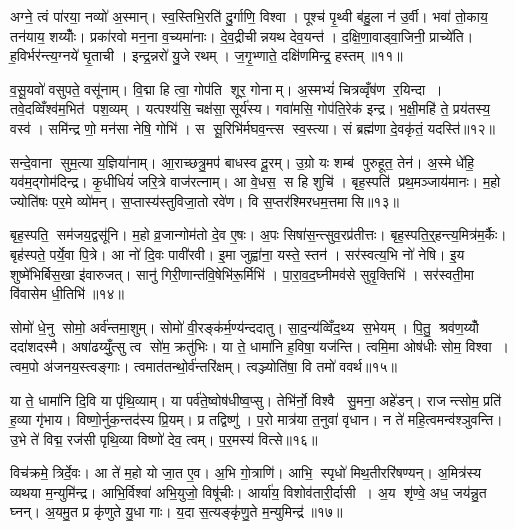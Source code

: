 अग्ने॒ त्वं पा॑रया॒ नव्यो॑ अ॒स्मान्। स्व॒स्तिभि॒रति॑ दु॒र्गाणि॒ विश्वा। पूश्च॑ पृ॒थ्वी ब॑हु॒ला न॑ उ॒र्वी। भवा॑ तो॒काय॒ तन॑याय॒ शय्योँः। प्रका॑रवो मन॒ना व॒च्यमा॑नाः। दे॒व॒द्रीचीन्नयथ देव॒यन्त॑। द॒क्षि॒णा॒वाड्वा॒जिनी॒ प्राच्ये॑ति। ह॒विर्भर॑न्त्य॒ग्नये॑ घृ॒ताची। इन्द्र॒न्नरो॑ यु॒जे रथम्। ज॒गृ॒भ्णाते॒ दक्षि॑णमिन्द्र॒ हस्तम्॥११॥

व॒सू॒यवो॑ वसुपते॒ वसू॑नाम्। वि॒द्मा हि त्वा॒ गोप॑ति शूर॒ गोनाम्। अ॒स्मभ्यं॑ चित्रव्वृँष॑ण र॒यिन्दा। तवे॒दव्विँश्व॑म॒भित॑ पश॒व्यम्। यत्पश्य॑सि॒ चक्ष॑सा॒ सूर्य॑स्य। गवा॑मसि॒ गोप॑ति॒रेक॑ इन्द्र। भ॒क्षी॒महि॑ ते॒ प्रय॑तस्य॒ वस्व॑। समि॑न्द्र णो॒ मन॑सा नेषि॒ गोभि॑। स सू॒रिभि॑र्मघव॒न्त्स स्व॒स्त्या। सं ब्रह्म॑णा दे॒वकृ॑तं॒ यदस्ति॑॥१२॥

सन्दे॒वाना सुम॒त्या य॒ज्ञिया॑नाम्। आ॒राच्छत्रु॒मप॑ बाधस्व दू॒रम्। उ॒ग्रो यः शम्ब॑ पुरुहूत॒ तेन॑। अ॒स्मे धे॑हि॒ यव॑म॒द्गोम॑दिन्द्र। कृ॒धीधियं॑ जरि॒त्रे वाज॑रत्नाम्। आ वे॒धस॒ स हि शुचि॑। बृह॒स्पति॑ प्रथ॒मञ्जाय॑मानः। म॒हो ज्योति॑षः पर॒मे व्यो॑मन्। स॒प्तास्य॑स्तुविजा॒तो रवे॑ण। वि स॒प्तर॑श्मिरधम॒त्तमासि॥१३॥

बृह॒स्पति॒ सम॑जय॒द्वसू॑नि। म॒हो व्र॒जान्गोम॑तो दे॒व ए॒षः। अ॒पः सिषा॑स॒न्त्सुव॒रप्र॑तीत्तः। बृह॒स्पति॒र्॒हन्त्य॒मित्र॑म॒र्कैः। बृह॑स्पते॒ पर्ये॒वा पि॒त्रे। आ नो॑ दि॒वः पावी॑रवी। इ॒मा जुह्वा॑ना॒ यस्ते॒ स्तन॑। सर॑स्वत्य॒भि नो॑ नेषि। इ॒य शुष्मे॑भिर्बिस॒खा इ॑वारुजत्। सानु॑ गिरी॒णान्त॑वि॒षेभि॑रू॒र्मिभि॑। पा॒रा॒व॒द॒घ्नीमव॑से सुवृ॒क्तिभि॑। सर॑स्वती॒मा वि॑वासेम धी॒तिभि॑॥१४॥\anuvakamend[दे॒व॒यानैर्दे॒वाः सुपू॑तय्यँजत्र॒ हस्त॒मस्ति॒ तमास्यू॒र्मिभि॒र्द्वे च॑]

सोमो॑ धे॒नु सोमो॒ अर्व॑न्तमा॒शुम्। सोमो॑ वी॒रङ्क॑र्म॒ण्य॑न्ददातु। सा॒द॒न्य॑व्विँद॒थ्य स॒भेयम्। पि॒तु॒ श्रव॑ण॒य्योँ ददा॑शदस्मै। अषा॑ढय्युँ॒त्सु त्व सो॑म॒ क्रतु॑भिः। या ते॒ धामा॑नि ह॒विषा॒ यज॑न्ति। त्वमि॒मा ओष॑धीः सोम॒ विश्वा। त्वम॒पो अ॑जनय॒स्त्वङ्गाः। त्वमात॑तन्थो॒र्व॑न्तरि॑क्षम्। त्वञ्ज्योति॑षा॒ वि तमो॑ ववर्थ॥१५॥

या ते॒ धामा॑नि दि॒वि या पृ॑थि॒व्याम्। या पर्व॑ते॒ष्वोष॑धीष्व॒प्सु। तेभि॑र्नो॒ विश्वै सु॒मना॒ अहे॑डन्। राजन्त्सोम॒ प्रति॑ ह॒व्या गृ॑भाय। विष्णो॒र्नुक॒न्तद॑स्य प्रि॒यम्। प्र तद्विष्णु॑। प॒रो मात्र॑या त॒नुवा॑ वृधान। न ते॑ महि॒त्वमन्व॑श्ञुवन्ति। उ॒भे ते॑ विद्म॒ रज॑सी पृथि॒व्या विष्णो॑ देव॒ त्वम्। प॒र॒मस्य॑ वित्से॥१६॥

विच॑क्रमे॒ त्रिर्दे॒वः। आ ते॑ म॒हो यो जा॒त ए॒व। अ॒भि गो॒त्राणि॑। आभि॒ स्पृधो॑ मिथ॒तीररि॑षण्यन्। अ॒मित्र॑स्य व्यथया म॒न्युमि॑न्द्र। आभि॒र्विश्वा॑ अभि॒युजो॒ विषू॑चीः। आर्या॑य॒ विशोव॑तारी॒र्दासी। अ॒य शृ॑ण्वे॒ अध॒ जय॑न्नु॒त घ्नन्। अ॒यमु॒त प्र कृ॑णुते यु॒धा गाः। य॒दा स॒त्यङ्कृ॑णु॒ते म॒न्युमिन्द्र॑॥१७॥

